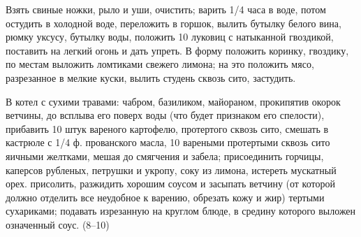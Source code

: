 
Взять свиные ножки, рыло и уши, очистить; варить 1/4 часа в воде, потом остудить в холодной воде, переложить в горшок, вылить бутылку белого вина, рюмку уксусу, бутылку воды, положить 10 луковиц с натыканной гвоздикой, поставить на легкий огонь и дать упреть. В форму положить коринку, гвоздику, по местам выложить ломтиками свежего лимона; на это положить мясо, разрезанное в мелкие куски, вылить студень сквозь сито, застудить. 


В котел с сухими травами: чабром, базиликом, майораном, прокипятив окорок ветчины, до всплыва его поверх воды (что будет признаком его спелости), прибавить 10 штук вареного картофелю, протертого сквозь сито, смешать в кастрюле с 1/4 ф. прованского масла, 10 вареными протертыми сквозь сито яичными желтками, мешая до смягчения и забела; присоединить горчицы, каперсов рубленых, петрушки и укропу, соку из лимона, истереть мускатный орех. присолить, разжидить хорошим соусом и засыпать ветчину (от которой должно отделить все неудобное к варению, обрезать кожу и жир) тертыми сухариками; подавать изрезанную на круглом блюде, в средину которого выложен означенный соус. (8--10)
